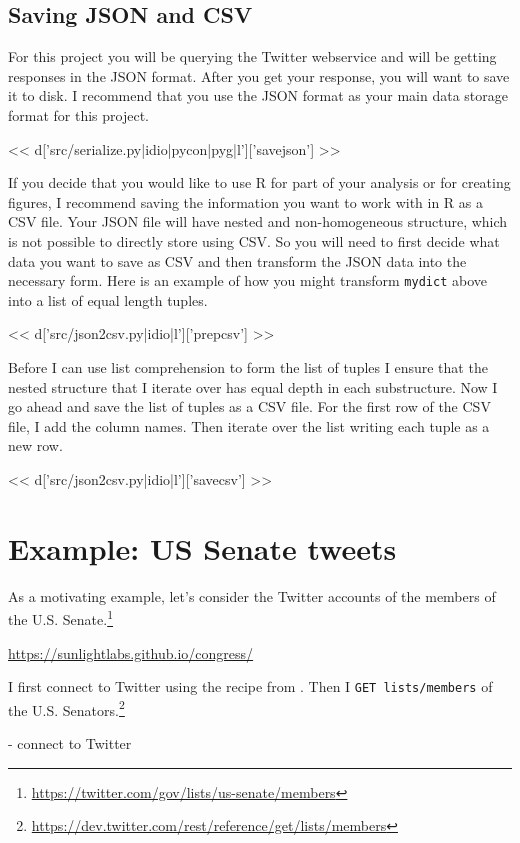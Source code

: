 \subsection*{Saving JSON and CSV}
For this project you will be querying the Twitter webservice and will
be getting responses in the JSON format.  After you get your response,
you will want to save it to disk.  I recommend that you use the JSON
format as your main data storage format for this project.

<< d['src/serialize.py|idio|pycon|pyg|l']['savejson'] >>

If you decide that you would like to use R for part of your analysis or for
creating figures, I recommend saving the information you want to work with in R
as a CSV file.  Your JSON file will have nested and non-homogeneous structure,
which is not possible to directly store using CSV.  So you will need to first
decide what data you want to save as CSV and then transform the JSON data into
the necessary form.  Here is an example of how you might transform
\texttt{mydict} above into a list of equal length tuples.

<< d['src/json2csv.py|idio|l']['prepcsv'] >>

Before I can use list comprehension to form the list of tuples I ensure that
the nested structure that I iterate over has equal depth in each substructure.
Now I go ahead and save the list of tuples as a CSV file.  For the first row
of the CSV file, I add the column names.  Then iterate over the list writing
each tuple as a new row.

<< d['src/json2csv.py|idio|l']['savecsv'] >>


\section{Example: US Senate tweets}

As a motivating example, let's consider the Twitter accounts of the
members of the U.S. Senate.\footnote{\url{https://twitter.com/gov/lists/us-senate/members}}

\url{https://sunlightlabs.github.io/congress/}

I first connect to Twitter using the recipe from \cite{russell2013mining}.
Then I \texttt{GET lists/members} of the U.S.
Senators.\footnote{\url{https://dev.twitter.com/rest/reference/get/lists/members}}





- connect to Twitter

